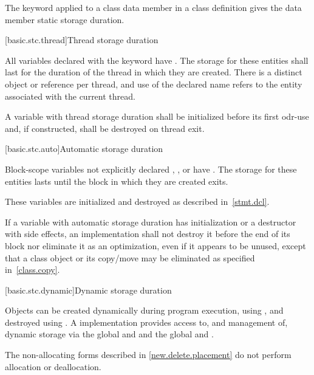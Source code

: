 \pnum
{}%
The keyword  applied to a class data member in a class
definition gives the data member static storage duration.

[basic.stc.thread]{Thread storage duration}

\pnum
{}%
All variables declared with the  keyword have . The storage for these entities shall last for the duration of
the thread in which they are created. There is a distinct object or reference
per thread, and use of the declared name refers to the entity associated with
the current thread.

\pnum
A variable with thread storage duration shall be initialized before
its first odr-use and, if constructed, shall be destroyed on thread exit.

[basic.stc.auto]{Automatic storage duration}

\pnum
{}%
%
Block-scope variables
not explicitly declared , , or  have
. The storage
for these entities lasts until the block in which they are created exits.

\pnum
\begin{note}
These variables are initialized and destroyed as described in~\ref{stmt.dcl}.
\end{note}

\pnum
If a variable with automatic storage duration has initialization or a destructor with side
effects, an implementation shall not destroy it before the end of its block
nor eliminate it as an optimization, even if it appears to be
unused, except that a class object or its copy/move may be eliminated as
specified in~\ref{class.copy}.

[basic.stc.dynamic]{Dynamic storage duration}%

\pnum
Objects can be created dynamically during program
execution, using
%
, and destroyed using
%
. A \Cpp{} implementation
provides access to, and management of, dynamic storage via the global
  and  and the global   and .
\begin{note}
The non-allocating forms described in \ref{new.delete.placement}
do not perform allocation or deallocation.
\end{note}


